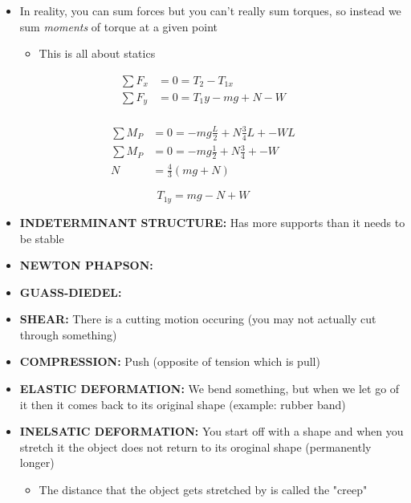 \begin{itemize}
    \item In reality, you can sum forces but you can't really sum torques, so instead we sum \textit{moments} of torque at a given point
    \begin{itemize}
        \item This is all about statics
    \end{itemize}
\end{itemize}

\begin{problem}
    \[
    \begin{aligned}
        \sum F_x &= 0 = T_2 - T_{1x}\\
        \sum F_y &= 0 = T_1y - mg + N - W\\   
    \end{aligned}
    \]

    \[
        \begin{aligned}
            \sum M_P &= 0 = -mg\frac{L}{2} + N\frac{3}{4}L + - WL\\
            \sum M_P &= 0 = -mg\frac{1}{2} + N\frac{3}{4} + - W\\
            N &= \frac{4}{3}(mg+N)
        \end{aligned}      
    \]

    \[
      T_{1y} = mg - N + W  
    \]
\end{problem}

\begin{itemize}
    \item \textbf{INDETERMINANT STRUCTURE:} Has more supports than it needs to be stable
    \item \textbf{NEWTON PHAPSON:}
    \item \textbf{GUASS-DIEDEL:}
    \item \textbf{SHEAR:} There is a cutting motion occuring (you may not actually cut through something)
    \item \textbf{COMPRESSION:} Push (opposite of tension which is pull)
    \item \textbf{ELASTIC DEFORMATION:} We bend something, but when we let go of it then it comes back to its original shape (example: rubber band)
    \item \textbf{INELSATIC DEFORMATION:} You start off with a shape and when you stretch it the object does not return to its oroginal shape (permanently longer)
    \begin{itemize}
        \item The distance that the object gets stretched by is called the "creep"
    \end{itemize}
\end{itemize}

